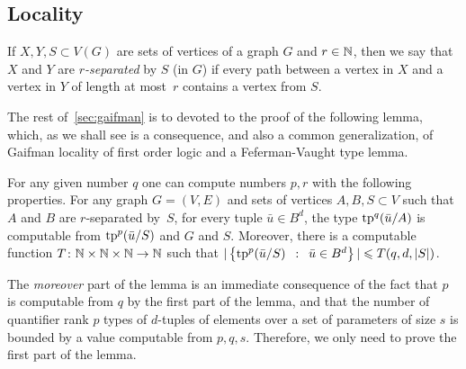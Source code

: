 \subsection{Locality}
If $X,Y,S\subset V(G)$ are sets of vertices of a graph $G$ 
and $r\in \mathbb{N}$, then we say that $X$ and $Y$ are  \emph{$r$-separated}
by $S$  (in $G$) if every path between a vertex in $X$ and a vertex in 
$Y$ of length at most~$r$ contains a vertex from $S$.


The rest of~\cref{sec:gaifman} is to devoted to the proof of the following  lemma, which, as we shall see 
is a consequence, and also a common generalization, of Gaifman locality of first order logic and a Feferman-Vaught type  lemma.




\begin{lemma}%
	\label{lem:types}
For any given number $q$
one can compute numbers $p,r$ with the following properties.	For any graph $G=(V,E)$ and sets of vertices $A,B,S\subset V$	
	such that $A$  and $B$ are $r$-separated by~$S$,
	for every tuple $\bar u\in B^{d}$, 
	the type $\mathrm{tp}^q(\bar u/A)$
	is computable from  $\mathrm{tp}^{p}(\bar u/S)$ and $G$ and $S$.
  Moreover, there is a computable function $T\colon \mathbb{N}\times\mathbb{N}\times\mathbb{N}\to\mathbb{N}$
  such that $|\left\{\mathrm{tp}^{p}(\bar u/S) \,~:~\, \bar u\in B^d \right\}|\leqslant T(q,d,|S|)$.
  
  
\end{lemma}

The \emph{moreover} part of the lemma is an immediate consequence of the fact that $p$
is computable from $q$ by the first part of the lemma,
and that the number of quantifier rank $p$ types of $d$-tuples of elements over a set of parameters of  size $s$ is bounded by a value computable from $p,q,s$. Therefore, we only need to prove the first part of the lemma.



